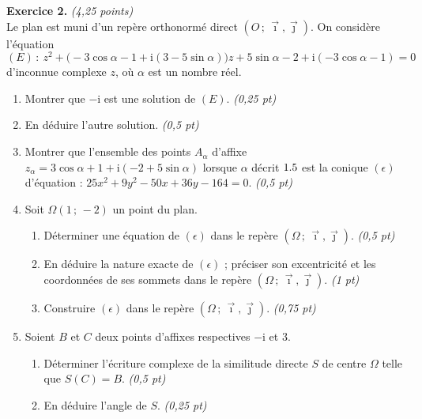 \smallskip
\noindent\textbf{Exercice 2.} \hfill\textit{(4,25 points)}\\
Le plan est muni d'un repère orthonormé direct $(O\,;\,\vec\imath,\vec\jmath)$. On considère
l'équation
\[
(E)\,:\ z^2+\bigl(-3\cos\alpha-1+\mathrm i(3-5\sin\alpha)\bigr)z+5\sin\alpha-2+\mathrm i(-3\cos\alpha-1)=0
\]
d'inconnue complexe $z$, où $\alpha$ est un nombre réel.
\begin{enumerate}[label=\arabic*)]
\item Montrer que $-\mathrm i$ est une solution de $(E)$. \hfill\textit{(0,25 pt)}
\item En déduire l'autre solution. \hfill\textit{(0,5 pt)}
\item Montrer que l'ensemble des points $A_\alpha$ d'affixe
$z_\alpha=3\cos\alpha+1+\mathrm i(-2+5\sin\alpha)$ lorsque $\alpha$ décrit $1.5$ est la conique
$(\epsilon)$ d'équation : $25x^2+9y^2-50x+36y-164=0$. \hfill\textit{(0,5 pt)}
\item Soit $\Omega(1\,;\,-2)$ un point du plan.
  \begin{enumerate}[label=\alph*)]
  \item Déterminer une équation de $(\epsilon)$ dans le repère $(\Omega\,;\,\vec\imath,\vec\jmath)$. \hfill\textit{(0,5 pt)}
  \item En déduire la nature exacte de $(\epsilon)$ ; préciser son excentricité et les
  coordonnées de ses sommets dans le repère $(\Omega\,;\,\vec\imath,\vec\jmath)$. \hfill\textit{(1 pt)}
  \item Construire $(\epsilon)$ dans le repère $(\Omega\,;\,\vec\imath,\vec\jmath)$. \hfill\textit{(0,75 pt)}
  \end{enumerate}
\item Soient $B$ et $C$ deux points d'affixes respectives $-\mathrm i$ et $3$.
  \begin{enumerate}[label=\alph*)]
  \item Déterminer l'écriture complexe de la similitude directe $S$ de centre $\Omega$ telle que $S(C)=B$. \hfill\textit{(0,5 pt)}
  \item En déduire l'angle de $S$. \hfill\textit{(0,25 pt)}
  \end{enumerate}
\end{enumerate}

